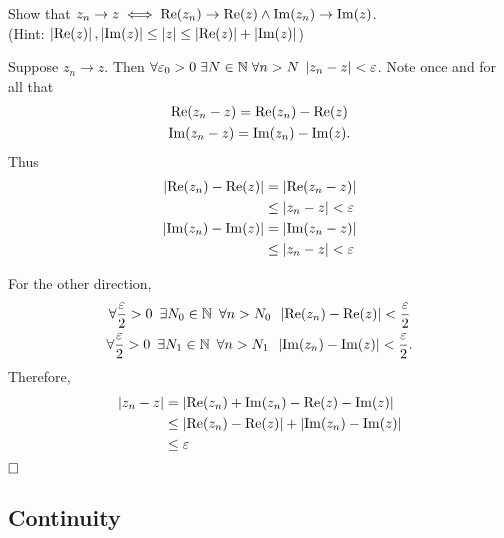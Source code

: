 \documentclass[11pt, oneside]{book}
\begin{document}
\begin{ex}\label{ex:convergence in complex iff convergence of real and imaginary parts in real}
	Show that $z_n \to z \iff \operatorname{Re}(z_n) \to \operatorname{Re}(z) \land \operatorname{Im}(z_n) \to \operatorname{Im}(z)$. \\
	(Hint: $\left|\operatorname{Re}(z)\right|, \left|\operatorname{Im}(z)\right| \leq \left|z\right| \leq \left|\operatorname{Re}(z)\right| + \left|\operatorname{Im}(z)\right|$)

	\begin{solution}
		Suppose $z_n \to z$. Then $\forall \varepsilon_0 > 0 \; \exists N \in \mathbb{N} \; \forall n > N \; \left|z_n - z\right| < \varepsilon$. Note once and for all that
		\begin{gather*}
			\operatorname{Re}(z_n - z) = \operatorname{Re}(z_n) - \operatorname{Re}(z) \\
			\operatorname{Im}(z_n - z) = \operatorname{Im}(z_n) - \operatorname{Im}(z).
		\end{gather*}
		Thus
		\begin{align*}
			\left|\operatorname{Re}(z_n) - \operatorname{Re}(z)\right| &= \left|\operatorname{Re}(z_n - z)\right| \\
					&\leq \left|z_n - z\right| < \varepsilon \\
			\left|\operatorname{Im}(z_n) - \operatorname{Im}(z)\right| &= \left|\operatorname{Im}(z_n - z)\right| \\
					&\leq \left|z_n - z\right| < \varepsilon
		\end{align*}

		For the other direction,
		\begin{gather*}
			\forall \frac{\varepsilon}{2} > 0 \enspace \exists N_0 \in \mathbb{N} \enspace \forall n > N_0 \enspace \left|\operatorname{Re}(z_n) - \operatorname{Re}(z)\right| < \frac{\varepsilon}{2} \\
			\forall \frac{\varepsilon}{2} > 0 \enspace \exists N_1 \in \mathbb{N} \enspace \forall n > N_1 \enspace \left|\operatorname{Im}(z_n) - \operatorname{Im}(z)\right| < \frac{\varepsilon}{2}.
		\end{gather*}
		Therefore,
		\begin{align*}
			\left|z_n - z\right| &= \left|\operatorname{Re}(z_n) + \operatorname{Im}(z_n) - \operatorname{Re}(z) - \operatorname{Im}(z)\right| \\
				&\leq \left|\operatorname{Re}(z_n) - \operatorname{Re}(z)\right| + \left|\operatorname{Im}(z_n) - \operatorname{Im}(z)\right| \\
				&\leq \varepsilon
		\end{align*}
		$\qed$
	\end{solution}
\end{ex}


\subsection{Continuity} %
\label{sub:continuity}
\end{document}

